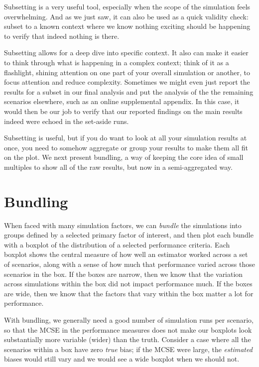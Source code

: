 \documentclass[
]{book}
\begin{document}
Subsetting is a very useful tool, especially when the scope of the simulation feels overwhelming.
And as we just saw, it can also be used as a quick validity check: subset to a known context where we know nothing exciting should be happening to verify that indeed nothing is there.

Subsetting allows for a deep dive into specific context.
It also can make it easier to think through what is happening in a complex context; think of it as a flashlight, shining attention on one part of your overall simulation or another, to focus attention and reduce complexity.
Sometimes we might even just report the results for a subset in our final analysis and put the analysis of the the remaining scenarios elsewhere, such as an online supplemental appendix.
In this case, it would then be our job to verify that our reported findings on the main results indeed were echoed in the set-aside runs.

Subsetting is useful, but if you do want to look at all your simulation results at once, you need to somehow aggregate or group your results to make them all fit on the plot.
We next present bundling, a way of keeping the core idea of small multiples to show all of the raw results, but now in a semi-aggregated way.

\section{Bundling}\label{bundling}

When faced with many simulation factors, we can \emph{bundle} the simulations into groups defined by a selected primary factor of interest, and then plot each bundle with a boxplot of the distribution of a selected performance criteria.
Each boxplot shows the central measure of how well an estimator worked across a set of scenarios, along with a sense of how much that performance varied across those scenarios in the box.
If the boxes are narrow, then we know that the variation across simulations within the box did not impact performance much.
If the boxes are wide, then we know that the factors that vary within the box matter a lot for performance.

With bundling, we generally need a good number of simulation runs per scenario, so that the MCSE in the performance measures does not make our boxplots look substantially more variable (wider) than the truth.
Consider a case where all the scenarios within a box have zero \emph{true} bias; if the MCSE were large, the \emph{estimated} biases would still vary and we would see a wide boxplot when we should not.
\end{document}

